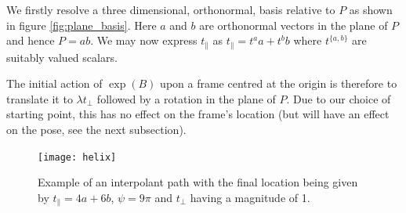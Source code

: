 We firstly resolve a three dimensional, orthonormal, basis relative to $P$ as shown in figure 
\ref{fig:plane_basis}. Here $a$ and $b$ are orthonormal vectors in the plane of $P$ and hence
$P = ab$. We may now express $t_\parallel$ as $t_\parallel = t^a a + t^b b$ where $t^{\{a,b\}}$ are suitably
valued scalars.

The initial action of $\exp(B)$ upon a frame centred at the origin is therefore to 
translate it to $\lambda t_\perp$ followed by a rotation in the plane of $P$. Due to our choice of starting
point, this has no effect on the frame's location (but will have an effect on the pose, 
see the next subsection).


\begin{figure}\centering
\texttt{[image: helix]}
\caption{\label{fig:helix} Example of an interpolant path with the final location being given by
$t_\parallel = 4a + 6b$, $\psi = 9\pi$ and $t_\perp$ having a magnitude of 1.}
\end{figure}


